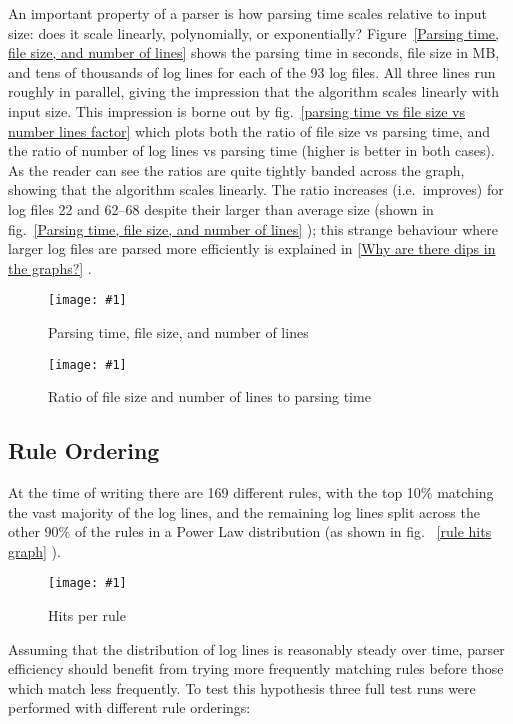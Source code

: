 \documentclass[draft]{svmult}
\newcommand{\showgraph}[3]{%
    \begin{figure}[hbt!]%
        \caption{#2}\label{#3}%
        \texttt{[image: \#1]}%
    \end{figure}%
}
\newcommand{\refwithpage}[1]{%
    \empty{}\vref{#1}%
}
\newcommand{\sectionref}[1]{%
    \textsection{}\vref*{#1}%
}
\newcommand{\refwithlabel}[2]{%
    #1~\vref{#2}%
}
\newcommand{\graphref}[1]{%
    \refwithlabel{fig.}{#1}%
}
\newcommand{\Graphref}[1]{%
    \refwithlabel{Figure}{#1}%
}
\newcommand{\numberOFlogFILES}[0]{%
    93%
}
\newcommand{\numberOFrules}[0]{%
    169%
}
\begin{document}
An important property of a parser is how parsing time scales relative to
input size: does it scale linearly, polynomially, or exponentially?
\Graphref{Parsing time, file size, and number of lines} shows the parsing
time in seconds, file size in MB, and tens of thousands of log lines for
each of the \numberOFlogFILES{} log files.  All three lines run roughly in
parallel, giving the impression that the algorithm scales linearly with
input size.  This impression is borne out by \graphref{parsing time vs file
size vs number lines factor} which plots both the ratio of file size vs
parsing time, and the ratio of number of log lines vs parsing time (higher
is better in both cases).  As the reader can see the ratios are quite
tightly banded across the graph, showing that the algorithm scales
linearly.  The ratio increases (i.e.\ improves) for log files 22 and 62--68
despite their larger than average size (shown in \graphref{Parsing time,
file size, and number of lines}); this strange behaviour where larger log
files are parsed more efficiently is explained in \sectionref{Why are there
dips in the graphs?}.
\showgraph{build/plot-normal-filesize-numlines}{Parsing time, file size,
and number of lines}{Parsing time, file size, and number of lines}
\showgraph{build/plot-normal-filesize-numlines-factor}{Ratio of file size
and number of lines to parsing time}{parsing time vs file size vs number
lines factor}

\subsection{Rule Ordering}

\label{Rule ordering}
\label{rule ordering for efficiency}
\label{rule efficiency}

At the time of writing there are \numberOFrules{} different rules, with the
top 10\% matching the vast majority of the log lines, and the remaining log
lines split across the other 90\% of the rules in a Power Law distribution
(as shown in fig.~\refwithpage{rule hits graph}).
\showgraph{build/plot-hits}{Hits per rule}{rule hits graph} Assuming that
the distribution of log lines is reasonably steady over time, parser
efficiency should benefit from trying more frequently matching rules before
those which match less frequently.  To test this hypothesis three full test
runs were performed with different rule orderings:
\end{document}
